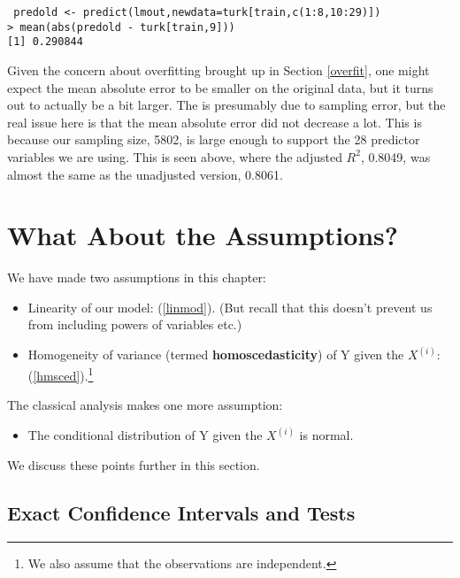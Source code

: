\begin{lstlisting}
 predold <- predict(lmout,newdata=turk[train,c(1:8,10:29)])
> mean(abs(predold - turk[train,9]))
[1] 0.290844
\end{lstlisting}

Given the concern about overfitting brought up in Section \ref{overfit},
one might expect the mean absolute error to be smaller on the original
data, but it turns out to actually be a bit larger.  The is presumably
due to sampling error, but the real issue here is that the mean absolute
error did not decrease a lot.  This is because our sampling size, 5802,
is large enough to support the 28 predictor variables we are using.
This is seen above, where the adjusted $R^2$, 0.8049, was almost the
same as the unadjusted version, 0.8061.

\section{What About the Assumptions?}

We have made two assumptions in this chapter:

\begin{itemize}

\item Linearity of our model:  (\ref{linmod}).  (But recall that this
doesn't prevent us from including powers of variables etc.)

\item Homogeneity of variance (termed {\bf homoscedasticity}) of Y given
the $X^{(i)}$: (\ref{hmsced}).\footnote{We also assume that the
observations are independent.}

\end{itemize}

The classical analysis makes one more assumption:

\begin{itemize}

\item The conditional distribution of Y given the $X^{(i)}$ is normal.

\end{itemize}

We discuss these points further in this section.

\subsection{Exact Confidence Intervals and Tests}
\label{exactlinreg}


